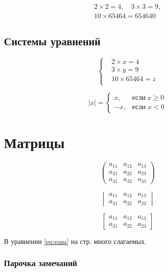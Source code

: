 \documentclass[a4paper,14pt]{extarticle}
\begin{document}
\begin{equation}
\begin{gathered}
	2\times 2 = 4, \hspace{1em} 3\times 3 = 9,\\
	10 \times 65464 = 654640
\end{gathered}
\end{equation}

\subsection{Системы уравнений}

\[
\left\{
\begin{aligned}
	&2\times x = 4  \\
	&3\times y = 9\\
	&10 \times 65464 = z\\
\end{aligned}
\right.
\]

\[
|x|=\begin{cases}
	x, &\text{если}\;  x \ge 0 \\
	-x, &\text{если } x<0
\end{cases}
\]

\section{Матрицы}

\[
\begin{pmatrix}
	a_{11} & a_{12} & a_{13} \\
	a_{21} & a_{22} & a_{23} \\
	a_{31} & a_{32} & a_{33}
\end{pmatrix}
\]

\[
\begin{vmatrix}
	a_{11} & a_{12} & a_{13} \\
	a_{21} & a_{22} & a_{23}
\end{vmatrix}
\]

\[
\begin{bmatrix}
	a_{11} & a_{12} & a_{13} \\
	a_{21} & a_{22} & a_{23}
\end{bmatrix}
\]

В уравнении \eqref{eq:sum} на стр. \pageref{eq:sum} много слагаемых.

\subsubsection*{Парочка замечаний}
\end{document}
